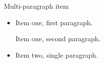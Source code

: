 \documentclass[14pt,t]{beamer-accessibility}
\begin{document}
\begin{frame}{Multi-paragraph item}
\begin{itemize}
\item Item one, first paragraph.

Item one, second paragraph.
\item Item two, single paragraph.
\end{itemize}
\end{frame}
\end{document}
